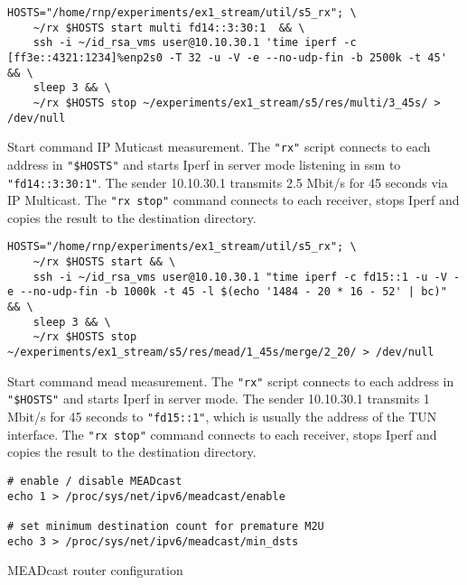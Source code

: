 \begin{listing}[h]
\begin{verbatim}
HOSTS="/home/rnp/experiments/ex1_stream/util/s5_rx"; \
    ~/rx $HOSTS start multi fd14::3:30:1  && \
    ssh -i ~/id_rsa_vms user@10.10.30.1 'time iperf -c [ff3e::4321:1234]%enp2s0 -T 32 -u -V -e --no-udp-fin -b 2500k -t 45' && \
    sleep 3 && \
    ~/rx $HOSTS stop ~/experiments/ex1_stream/s5/res/multi/3_45s/ > /dev/null
\end{verbatim}
    \caption[Start command IP Multicast measurement]{Start command IP Muticast measurement.
        The \texttt{"rx"} script connects to each address in \texttt{"\$HOSTS"} and starts Iperf in server mode listening in \gls{ssm} to \texttt{"fd14::3:30:1"}.
        The sender 10.10.30.1 transmits 2.5 Mbit/s for 45 seconds via IP Multicast.
        The \texttt{"rx stop"} command connects to each receiver, stops Iperf and copies the result to the destination directory.
    }
\label{lst:multi_start_cmd}
\end{listing}

\begin{listing}[h]
\begin{verbatim}
HOSTS="/home/rnp/experiments/ex1_stream/util/s5_rx"; \
    ~/rx $HOSTS start && \
    ssh -i ~/id_rsa_vms user@10.10.30.1 "time iperf -c fd15::1 -u -V -e --no-udp-fin -b 1000k -t 45 -l $(echo '1484 - 20 * 16 - 52' | bc)" && \
    sleep 3 && \
    ~/rx $HOSTS stop ~/experiments/ex1_stream/s5/res/mead/1_45s/merge/2_20/ > /dev/null
\end{verbatim}
    \caption[Start command MEADcast measurement]{Start command \gls{mead} measurement.
        The \texttt{"rx"} script connects to each address in \texttt{"\$HOSTS"} and starts Iperf in server mode.
        The sender 10.10.30.1 transmits 1 Mbit/s for 45 seconds to \texttt{"fd15::1"}, which is usually the address of the TUN interface.
        The \texttt{"rx stop"} command connects to each receiver, stops Iperf and copies the result to the destination directory.
    }
\label{lst:mead_start_cmd}
\end{listing}

\begin{listing}
\begin{verbatim}
# enable / disable MEADcast
echo 1 > /proc/sys/net/ipv6/meadcast/enable

# set minimum destination count for premature M2U
echo 3 > /proc/sys/net/ipv6/meadcast/min_dsts
\end{verbatim}
    \caption[MEADcast router configuration]{MEADcast router configuration }
\label{lst:rt_cfg}
\end{listing}

